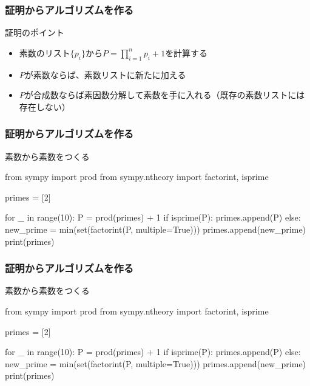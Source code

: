 \documentclass[dvipdfmx,11pt,notheorems]{beamer}
\theoremstyle{definition}
\begin{document}
\begin{frame}\frametitle{証明からアルゴリズムを作る}

\begin{block}{証明のポイント}
\begin{itemize}
\item 素数のリスト$\{p_{i}\}$から$P = \displaystyle \prod^{n}_{i=1}p_{i} + 1$を計算する
\item $P$が素数ならば、素数リストに新たに加える
\item $P$が合成数ならば素因数分解して素数を手に入れる（既存の素数リストには存在しない）
\end{itemize}
\end{block}

\end{frame}

\begin{frame}[fragile]\frametitle{証明からアルゴリズムを作る}

\begin{block}{素数から素数をつくる}
\begin{pyverbatim}
from sympy import prod
from sympy.ntheory import factorint, isprime

primes = [2]

for _ in range(10):
    P = prod(primes) + 1
    if isprime(P):
        primes.append(P)
    else:
        new_prime = min(set(factorint(P, multiple=True)))
        primes.append(new_prime)
print(primes)
\end{pyverbatim}
\end{block}

\end{frame}

\begin{frame}[fragile]\frametitle{証明からアルゴリズムを作る}

\begin{block}{素数から素数をつくる}
\begin{pycode}
from sympy import prod
from sympy.ntheory import factorint, isprime

primes = [2]

for _ in range(10):
    P = prod(primes) + 1
    if isprime(P):
        primes.append(P)
    else:
        new_prime = min(set(factorint(P, multiple=True)))
        primes.append(new_prime)
print(primes)
\end{pycode}
\end{block}

\end{frame}
\end{document}
